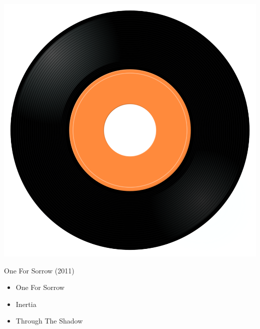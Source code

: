 \begin{minipage}[t]{0.25\textwidth}\vspace{0pt}
\captionsetup{type=figure}
\includegraphics[width=\textwidth]{Images/cover.png}
\caption*{One For Sorrow (2011)}
\end{minipage}
\begin{minipage}[t]{0.25\textwidth}\vspace{0pt}
\begin{itemize}[nosep,leftmargin=1em,labelwidth=*,align=left]
	\setlength{\itemsep}{0pt}
	\item One For Sorrow
	\item Inertia
	\item Through The Shadow
\end{itemize}
\end{minipage}
